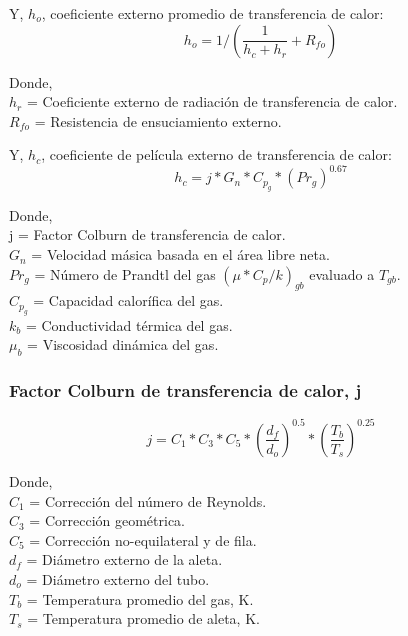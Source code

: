 \par Y, $h_o$, coeficiente externo promedio de transferencia de calor: 
\begin{equation*}
h_o = 1/(\frac{1}{h_c+h_r}+R_{fo})
\end{equation*}

\par Donde,\\
$h_r$ = Coeficiente externo de radiación de transferencia de calor.\\
$R_{fo}$ = Resistencia de ensuciamiento externo. \\

\par Y, $h_c$, coeficiente de película externo de transferencia de calor: 
\begin{equation*}
h_c = j *G_n *C_{p_g} *(Pr_g)^{0.67}
\end{equation*}

\par Donde,\\
j = Factor Colburn de transferencia de calor.\\
$G_n$ = Velocidad másica basada en el área libre neta.\\
$Pr_g$ = Número de Prandtl del gas $(\mu*C_p /k)_{gb}$ evaluado a $T_{gb}$.\\
$C_{p_g}$ = Capacidad calorífica del gas.\\
$k_b$ = Conductividad térmica del gas.\\
$\mu_b$ = Viscosidad dinámica del gas.\\

\subsubsection{Factor Colburn de transferencia de calor, j}
\begin{equation*}
j = C_1 *C_3 *C_5 *(\dfrac{d_f}{d_o})^{0.5} *(\frac{T_b}{T_s})^{0.25}
\end{equation*}

\par Donde, \\
$C_1$ = Corrección del número de Reynolds. \\
$C_3$ = Corrección geométrica. \\
$C_5$ = Corrección no-equilateral y de fila. \\
$d_f$ = Diámetro externo de la aleta. \\
$d_o$ = Diámetro externo del tubo. \\
$T_b$ = Temperatura promedio del gas, K. \\
$T_s$ = Temperatura promedio de aleta, K.\\

